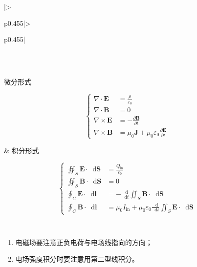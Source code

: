 \documentclass[UTF8,fontset=fandol,zihao=5]{ctexart}
\newcommand{\vect}[1]{\bm{#1}}
\newcommand{\dif}{\mathop{}\!\mathrm{d}}
\begin{document}
\noindent\begin{minipage}{\linewidth}
\centering
\begin{tabular}{|>{\raggedright\arraybackslash}p{}|>{\raggedright\arraybackslash}p{}|}
\hline
{}\\ \hline
{}\\ \hline

\centering 微分形式

\[
\left\{
\begin{aligned}
\nabla\cdot\vect{E} &= \frac{\rho}{\varepsilon_0}\\
\nabla\cdot\vect{B} &= 0\\
\nabla\times\vect{E} &= -\frac{\partial\vect{B}}{\partial t}\\
\nabla\times\vect{B} &= \mu_0\vect{J}
+\mu_0\varepsilon_0\frac{\partial\vect{E}}{\partial t}
\end{aligned}
\right.
\]\par\strut

& \centering\arraybackslash 积分形式

\[
\left\{
\begin{aligned}
\oiint_S \vect{E}\cdot\dif \vect{S}
&= \frac{Q_{\mathrm{in}}}{\varepsilon_0}\\
\oiint_S \vect{B}\cdot\dif \vect{S}
&= 0\\
\oint_C \vect{E}\cdot\dif \vect{l}
&= -\frac{\dif}{\dif t}
\iint_S \vect{B}\cdot\dif \vect{S}\\
\oint_C \vect{B}\cdot\dif \vect{l}
&= \mu_0 I_{\mathrm{in}}
+\mu_0\varepsilon_0\frac{\dif}{\dif t}
\iint_S \vect{E}\cdot\dif \vect{S}
\end{aligned}
\right.
\]\par\strut

\\ \hline
\end{tabular}
\end{minipage}\par

\endgroup

\begin{method}[【注意】电磁场]
\begin{enumerate}
  \item 电磁场要注意正负电荷与电场线指向的方向；
  \item 电场强度积分时要注意用第二型线积分。
\end{enumerate}
\end{method}
\end{document}
